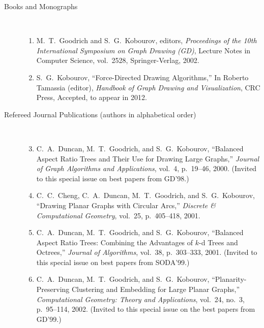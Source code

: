 \documentclass[10pt]{article}
\begin{document}
\begin{description}
\item [Books and Monographs]\

\begin{enumerate}

\item M.~T.~Goodrich and S.~G.~Kobourov, editors, {\em Proceedings of the 10th International Symposium on Graph Drawing (GD)}, Lecture Notes in Computer Science, vol.~2528, Springer-Verlag, 2002.

\item S.~G.~Kobourov, ``Force-Directed Drawing Algorithms,'' In
  Roberto Tamassia (editor),  {\em
    Handbook of Graph Drawing and Visualization}, CRC Press,  Accepted, to appear in 2012.
\end{enumerate}










\item [Refereed Journal Publications (authors in alphabetical order)]\


\begin{enumerate}
\setcounter{enumi}{2}

\item\label{bartgd}
C.~A.~Duncan, M.~T.~Goodrich, and S.~G.~Kobourov, ``Balanced Aspect
Ratio Trees and Their Use for Drawing Large Graphs,'' {\em Journal of
Graph Algorithms and Applications}, vol.~4, p.~19--46, 2000. (Invited to
this special issue on best papers from GD'98.)

\item\label{cheng}
C.~C.~Cheng, C.~A.~Duncan, M.~T.~Goodrich, and S.~G.~Kobourov,
``Drawing Planar Graphs with Circular Arcs,'' {\em Discrete \&
Computational Geometry}, vol.~25, p.~405--418, 2001.

\item\label{bart}
C.~A.~Duncan, M.~T.~Goodrich, and S.~G.~Kobourov, ``Balanced Aspect
Ratio Trees: Combining the Advantages of $k$-d Trees and
\mbox{Octrees},'' {\em Journal of Algorithms}, vol.~38, p.~303--333,
2001. (Invited to this special issue on best papers from SODA'99.)

\item\label{ppc}
C.~A.~Duncan, M.~T.~Goodrich, and S.~G.~Kobourov,
``Planarity-Preserving Clustering and Embedding for Large Planar
Graphs,'' {\em Computational Geometry: Theory and Applications},
vol.~24, no.~3, p.~95--114, 2002.  (Invited to this special issue on the
best papers from GD'99.)



\end{enumerate}
\end{description}
\end{document}
